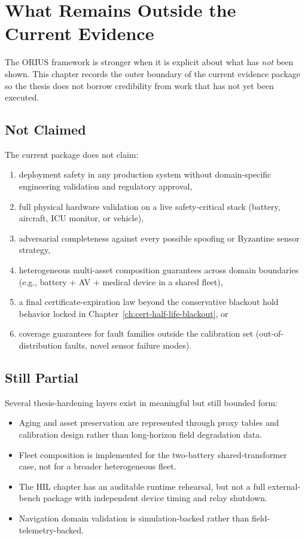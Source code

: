 \chapter{What Remains Outside the Current Evidence}
\label{ch:outside-current-evidence}

The ORIUS framework is stronger when it is explicit about what has \emph{not}
been shown.  This chapter records the outer boundary of the current evidence
package so the thesis does not borrow credibility from work that has not yet
been executed.

\section{Not Claimed}

The current package does not claim:

\begin{enumerate}
  \item deployment safety in any production system without domain-specific
    engineering validation and regulatory approval,
  \item full physical hardware validation on a live safety-critical stack
    (battery, aircraft, ICU monitor, or vehicle),
  \item adversarial completeness against every possible spoofing or
    Byzantine sensor strategy,
  \item heterogeneous multi-asset composition guarantees across domain
    boundaries (e.g., battery + AV + medical device in a shared fleet),
  \item a final certificate-expiration law beyond the conservative blackout
    hold behavior locked in Chapter~\ref{ch:cert-half-life-blackout}, or
  \item coverage guarantees for fault families outside the calibration set
    (out-of-distribution faults, novel sensor failure modes).
\end{enumerate}

\section{Still Partial}

Several thesis-hardening layers exist in meaningful but still bounded form:

\begin{itemize}
  \item Aging and asset preservation are represented through proxy tables and
    calibration design rather than long-horizon field degradation data.
  \item Fleet composition is implemented for the two-battery shared-transformer
    case, not for a broader heterogeneous fleet.
  \item The HIL chapter has an auditable runtime rehearsal, but not a full
    external-bench package with independent device timing and relay shutdown.
  \item Navigation domain validation is simulation-backed rather than
    field-telemetry-backed.
\end{itemize}

